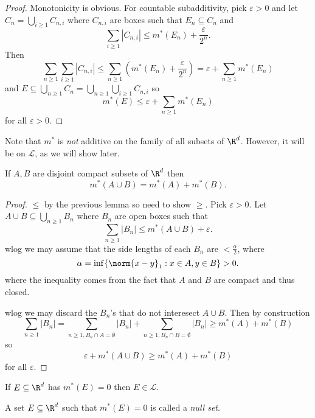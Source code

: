 \documentclass[a4paper]{article}
\begin{document}
\begin{proof}
  Monotonicity is obvious. For countable subadditivity, pick \(\varepsilon > 0\) and let \(C_n = \bigcup_{i \geq 1} C_{n, i}\) where \(C_{n, i}\) are boxes such that \(E_n \subseteq C_n\) and
  \[
    \sum_{i \geq 1} |C_{n, i}| \leq m^*(E_n) + \frac{\varepsilon}{2^n}.
  \]
  Then
  \[
    \sum_{n \geq 1} \sum_{i \geq 1} |C_{n, i}|
    \leq \sum_{n \geq 1} (m^*(E_n) + \frac{\varepsilon}{2^n})
    = \varepsilon + \sum_{n \geq 1} m^*(E_n)
  \]
  and \(E \subseteq \bigcup_{n \geq 1} C_n = \bigcup_{n \geq 1} \bigcup_{i \geq 1} C_{n, i}\) so
  \[
    m^*(E) \leq \varepsilon + \sum_{n \geq 1} m^*(E_n)
  \]
  for all \(\varepsilon > 0\).
\end{proof}

\begin{remark}
  Note that \(m^*\) is \emph{not} additive on the family of all subsets of \(\R^d\). However, it will be on \(\mathcal L\), as we will show later.
\end{remark}

\begin{lemma}
  If \(A, B\) are disjoint compact subsets of \(\R^d\) then
  \[
    m^*(A \cup B) = m^*(A) + m^*(B).
  \]
\end{lemma}

\begin{proof}
  \(\leq\) by the previous lemma so need to show \(\geq\). Pick \(\varepsilon > 0\). Let \(A \cup B \subseteq \bigcup_{n \geq 1} B_n\) where \(B_n\) are open boxes such that
  \[
    \sum_{n \geq 1} |B_n| \leq m^*(A \cup B) + \varepsilon.
  \]
  wlog we may assume that the side lengths of each \(B_n\) are \(< \frac{\alpha}{2}\), where
  \[
    \alpha = \inf \{\norm{x - y}_1: x \in A, y \in B\} > 0.
  \]
  where the inequality comes from the fact that \(A\) and \(B\) are compact and thus closed.

  wlog we may discard the \(B_n\)'s that do not interesect \(A \cup B\). Then by construction
  \[
    \sum_{n \geq 1} |B_n| = \sum_{n \geq 1, B_n \cap A = \emptyset} |B_n| + \sum_{n \geq 1, B_n \cap B = \emptyset} |B_n|
    \geq m^*(A) + m^*(B)
  \]
  so
  \[
    \varepsilon + m^*(A \cup B) \geq m^*(A) + m^*(B)
  \]
  for all \(\varepsilon\).
\end{proof}

\begin{lemma}
  If \(E \subseteq \R^d\) has \(m^*(E) = 0\) then \(E \in \mathcal L\).
\end{lemma}

\begin{definition}
  A set \(E \subseteq \R^d\) such that \(m^*(E) = 0\) is called a \emph{null set}.
\end{definition}
\end{document}
